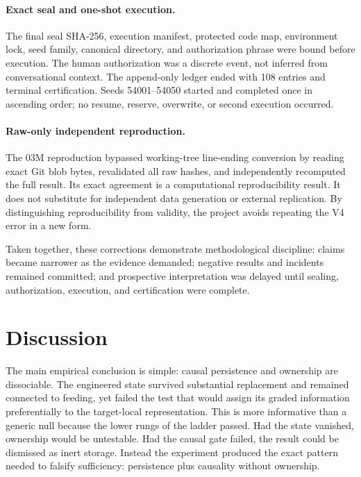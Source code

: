 \documentclass[11pt]{article}
\begin{document}
\paragraph{Exact seal and one-shot execution.}
The final seal SHA-256, execution manifest, protected code map, environment lock, seed family, canonical directory, and authorization phrase were bound before execution. The human authorization was a discrete event, not inferred from conversational context. The append-only ledger ended with 108 entries and terminal certification. Seeds 54001--54050 started and completed once in ascending order; no resume, reserve, overwrite, or second execution occurred.

\paragraph{Raw-only independent reproduction.}
The 03M reproduction bypassed working-tree line-ending conversion by reading exact Git blob bytes, revalidated all raw hashes, and independently recomputed the full result. Its exact agreement is a computational reproducibility result. It does not substitute for independent data generation or external replication. By distinguishing reproducibility from validity, the project avoids repeating the V4 error in a new form.

Taken together, these corrections demonstrate methodological discipline: claims became narrower as the evidence demanded; negative results and incidents remained committed; and prospective interpretation was delayed until sealing, authorization, execution, and certification were complete.

\section{Discussion}

The main empirical conclusion is simple: causal persistence and ownership are dissociable. The engineered state survived substantial replacement and remained connected to feeding, yet failed the test that would assign its graded information preferentially to the target-local representation. This is more informative than a generic null because the lower rungs of the ladder passed. Had the state vanished, ownership would be untestable. Had the causal gate failed, the result could be dismissed as inert storage. Instead the experiment produced the exact pattern needed to falsify sufficiency: persistence plus causality without ownership.
\end{document}

